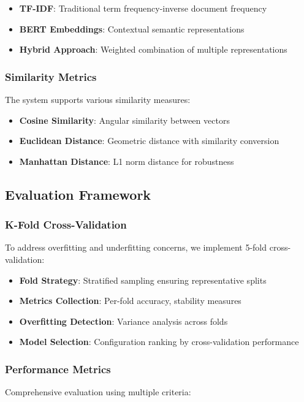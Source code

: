 \documentclass[12pt,a4paper]{article}
\begin{document}
\begin{itemize}
    \item \textbf{TF-IDF}: Traditional term frequency-inverse document frequency
    \item \textbf{BERT Embeddings}: Contextual semantic representations
    \item \textbf{Hybrid Approach}: Weighted combination of multiple representations
\end{itemize}

\subsubsection{Similarity Metrics}
The system supports various similarity measures:

\begin{itemize}
    \item \textbf{Cosine Similarity}: Angular similarity between vectors
    \item \textbf{Euclidean Distance}: Geometric distance with similarity conversion
    \item \textbf{Manhattan Distance}: L1 norm distance for robustness
\end{itemize}

\subsection{Evaluation Framework}

\subsubsection{K-Fold Cross-Validation}
To address overfitting and underfitting concerns, we implement 5-fold cross-validation:

\begin{itemize}
    \item \textbf{Fold Strategy}: Stratified sampling ensuring representative splits
    \item \textbf{Metrics Collection}: Per-fold accuracy, stability measures
    \item \textbf{Overfitting Detection}: Variance analysis across folds
    \item \textbf{Model Selection}: Configuration ranking by cross-validation performance
\end{itemize}

\subsubsection{Performance Metrics}
Comprehensive evaluation using multiple criteria:
\end{document}
